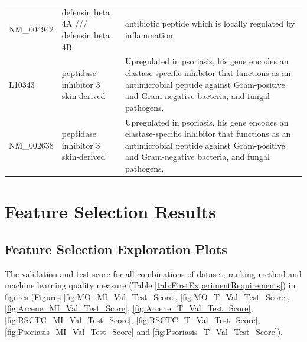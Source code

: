 \documentclass[10pt,a4paper]{report}
\begin{document}
\begin{table}[]
\begin{tabular}{l|p{5cm} p{8cm}}
			NM\_004942         & defensin  beta 4A /// defensin beta 4B                                                                                  & antibiotic peptide which is locally regulated by inflammation\cite{jansen2009beta}                                                                                                                                                                             \\
			L10343             & peptidase inhibitor 3  skin-derived                                                                                     & Upregulated in psoriasis, his gene encodes an elastase-specific inhibitor that functions as an antimicrobial peptide against Gram-positive and Gram-negative bacteria, and fungal pathogens.\cite{gudjonsson2010assessment, roesner2017inflammatory}                                              \\
			NM\_002638 &  peptidase inhibitor 3  skin-derived                                                                                           & Upregulated in psoriasis, his gene encodes an elastase-specific inhibitor that functions as an antimicrobial peptide against Gram-positive and Gram-negative bacteria, and fungal pathogens.\cite{gudjonsson2010assessment, roesner2017inflammatory}                                                                                        \\ \hline                                                                                                                                                                                                                                         
		\end{tabular}
	\end{table}
		\chapter{Feature Selection Results}
	
	\section{Feature Selection Exploration Plots}
	\label{app:FeatureSelectionExplorationPlots}
	
	The validation and test score for all combinations of dataset, ranking method and machine learning quality measure (Table \ref{tab:FirstExperimentRequirements}) in figures (Figures \ref{fig:MO_MI_Val_Test_Score}, \ref{fig:MO_T_Val_Test_Score}, \ref{fig:Arcene_MI_Val_Test_Score}, \ref{fig:Arcene_T_Val_Test_Score}, \ref{fig:RSCTC_MI_Val_Test_Score}, \ref{fig:RSCTC_T_Val_Test_Score}, \ref{fig:Psoriasis_MI_Val_Test_Score} and \ref{fig:Psoriasis_T_Val_Test_Score}). 
	
\end{document}
